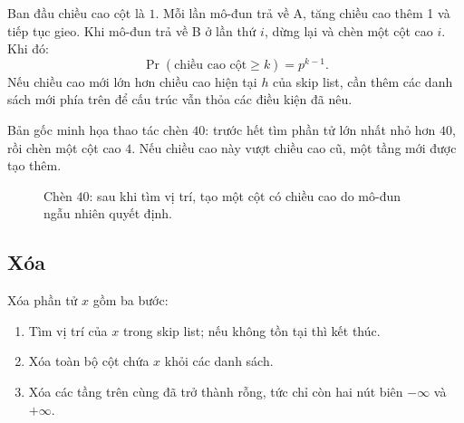 \documentclass[11pt]{article}
\newcommand{\Prob}{\mathop{\mathrm{Pr}}}
\begin{document}
Ban đầu chiều cao cột là \(1\). Mỗi lần mô-đun trả về A, tăng chiều cao thêm
1 và tiếp tục gieo. Khi mô-đun trả về B ở lần thứ \(i\), dừng lại và chèn một
cột cao \(i\). Khi đó:
\[
  \Prob(\text{chiều cao cột}\ge k)=p^{k-1}.
\]
Nếu chiều cao mới lớn hơn chiều cao hiện tại \(h\) của skip list, cần thêm các
danh sách mới phía trên để cấu trúc vẫn thỏa các điều kiện đã nêu.

Bản gốc minh họa thao tác chèn \(40\): trước hết tìm phần tử lớn nhất nhỏ hơn
\(40\), rồi chèn một cột cao \(4\). Nếu chiều cao này vượt chiều cao cũ, một
tầng mới được tạo thêm.

\begin{figure}[ht]
\centering
{}
\caption{Chèn \(40\): sau khi tìm vị trí, tạo một cột có chiều cao do mô-đun ngẫu nhiên quyết định.}
\end{figure}

\subsection{Xóa}

Xóa phần tử \(x\) gồm ba bước:
\begin{enumerate}
  \item Tìm vị trí của \(x\) trong skip list; nếu không tồn tại thì kết thúc.
  \item Xóa toàn bộ cột chứa \(x\) khỏi các danh sách.
  \item Xóa các tầng trên cùng đã trở thành rỗng, tức chỉ còn hai nút biên
  \(-\infty\) và \(+\infty\).
\end{enumerate}
\end{document}
